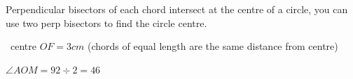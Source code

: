 \documentclass{report}
\begin{document}
{\begin{minipage}{0.3\textwidth}
\end{minipage}%
        \hfill%
\begin{minipage}{0.6\textwidth}\raggedright
Perpendicular bisectors of each chord intersect at the centre of a circle, you can use two perp bisectors to find the circle centre.
\end{minipage}

}


\ centre {$OF = 3cm$ (chords of equal length are the same distance from centre)}
\begin{center}
    $\angle AOM = 92\div 2 = 46$
\end{center}
\raggedright
\end{document}
